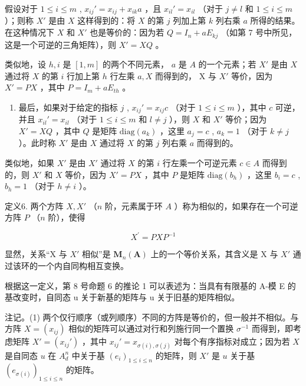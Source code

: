 假设对于 \(1 \leqslant i \leqslant m\) , \(x_{ij}' = x_{ij} + x_{ik}a\) ，且 \(x_{il}' = x_{il}\) （对于 \(j \neq l\) 和 \(1 \leqslant i \leqslant m\) ）；则称 \(X'\) 是由 \(X\) 这样得到的：将 \(X\) 的第 \(j\) 列加上第 \(k\) 列右乘 \(a\) 所得的结果。在这种情况下 \(X\) 和 \(X'\) 也是等价的：因为若 \(Q = I_n + aE_{kj}\) （如第 7 号中所见，这是一个可逆的三角矩阵），则 \(X' = XQ\) 。

类似地，设 \(h, i\) 是 \([1, m]\) 的两个不同元素， \(a\) 是 \(A\) 的一个元素；若 \(X'\) 是由 \(X\) 通过将 \(X\) 的第 \(i\) 行加上第 \(h\) 行左乘 \(a, X\) 而得到的， X 与 \(X'\) 等价，因为 \(X' = PX\) ，其中 \(P = I_m + aE_{th}\) 。

\begin{enumerate}
\def\labelenumi{(\arabic{enumi})}
\setcounter{enumi}{2}
\tightlist
\item
  最后，如果对于给定的指标 \(j\) , \(x_{ij}' = x_{ij}c\) （对于 \(1 \leqslant i \leqslant m\) ），其中 \(c\) 可逆，并且 \(x_{il}' = x_{il}\) （对于 \(1 \leqslant i \leqslant m\) 和 \(l \neq j\) ），则 \(X\) 和 \(X'\) 等价；因为 \(X' = XQ\) ，其中 \(Q\) 是矩阵 \(\text{diag}(a_k)\) ，这里 \(a_j = c\) , \(a_k = 1\) （对于 \(k \neq j\) ）。此时称 \(X'\) 是由 \(X\) 通过将 \(X\) 的第 \(j\) 列右乘 \(a\) 而得到的。
\end{enumerate}

类似地，如果 \(X'\) 是由 \(X'\) 通过将 \(X\) 的第 \(i\) 行左乘一个可逆元素 \(c \in A\) 而得到的，则 \(X'\) 和 \(X\) 等价，因为 \(X' = PX\) ，其中 \(P\) 是矩阵 \(\text{diag}(b_h)\) ，这里 \(b_i = c\) , \(b_h = 1\) （对于 \(h \neq i\) ）。

定义6. 两个方阵 \(X, X'\) （\(n\) 阶，元素属于环 \(A\) ）称为相似的，如果存在一个可逆方阵 \(P\) （\(n\) 阶），使得

\[
X ^ {\prime} = P X P ^ {- 1}\tag{41}
\]

显然，关系“X 与 \(X'\) 相似”是 \(\mathbf{M}_{n}(\mathbf{A})\) 上的一个等价关系，其含义是 X 与 \(X'\) 通过该环的一个内自同构相互变换。

根据这一定义，第 8 号命题 6 的推论 1 可以表述为：当具有有限基的 A-模 E 的基改变时，自同态 u 关于新基的矩阵与 u 关于旧基的矩阵相似。

注记。(1) 两个仅行顺序（或列顺序）不同的方阵是等价的，但一般并不相似。与方阵 \(X = (x_{ij})\) 相似的矩阵可以通过对行和列施行同一个置换 \(\sigma^{-1}\) 而得到，即考虑矩阵 \(X' = (x_{ij}')\) ，其中 \(x_{ij}' = x_{\sigma(i),\sigma(j)}\) 对每个有序指标对成立；因为若 \(X\) 是自同态 \(u\) 在 \(A_d^n\) 中关于基 \((e_i)_{1 \leq i \leq n}\) 的矩阵，则 \(X'\) 是 \(u\) 关于基 \((e_{\sigma(i)})_{1 \leq i \leq n}\) 的矩阵。

